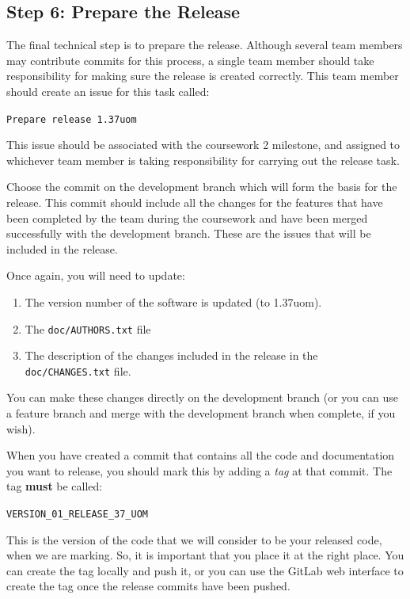 \documentclass[
]{book}
\providecommand{\tightlist}{%
  \setlength{\itemsep}{0pt}\setlength{\parskip}{0pt}}
\begin{document}
\hypertarget{reeleaseprep}{%
\subsection{Step 6: Prepare the Release}\label{reeleaseprep}}

The final technical step is to prepare the release. Although several team members may contribute commits for this process, a single team member should take responsibility for making sure the release is created correctly. This team member should create an issue for this task called:

\texttt{Prepare\ release\ 1.37uom}

This issue should be associated with the coursework 2 milestone, and assigned to whichever team member is taking responsibility for carrying out the release task.

Choose the commit on the development branch which will form the basis for the release. This commit should include all the changes for the features that have been completed by the team during the coursework and have been merged successfully with the development branch. These are the issues that will be included in the release.

Once again, you will need to update:

\begin{enumerate}
\def\labelenumi{\arabic{enumi}.}
\tightlist
\item
  The version number of the software is updated (to 1.37uom).
\item
  The \texttt{doc/AUTHORS.txt} file
\item
  The description of the changes included in the release in the \texttt{doc/CHANGES.txt} file.
\end{enumerate}

You can make these changes directly on the development branch (or you can use a feature branch and merge with the development branch when complete, if you wish).

When you have created a commit that contains all the code and documentation you want to release, you should mark this by adding a \emph{tag} at that commit. The tag \textbf{must} be called:

\texttt{VERSION\_01\_RELEASE\_37\_UOM}

This is the version of the code that we will consider to be your released code, when we are marking. So, it is important that you place it at the right place. You can create the tag locally and push it, or you can use the GitLab web interface to create the tag once the release commits have been pushed.
\end{document}
